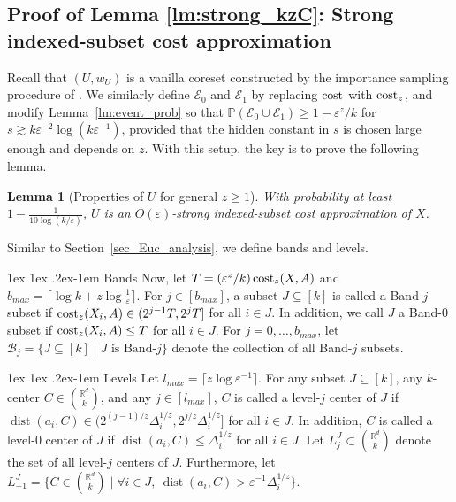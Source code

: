 \documentclass[11pt,letterpaper]{article}
\makeatletter
\renewcommand{\paragraph}{%
  \@startsection{paragraph}{4}%
  {\z@}{1ex \@plus 1ex \@minus .2ex}{-1em}%
  {\normalfont\normalsize\bfseries}%
}
\newtheorem{lemma}[theorem]{Lemma}
\theoremstyle{definition}
\newcommand{\eps}{\varepsilon}
\newcommand{\R}{\mathbb{R}}
\DeclareMathOperator{\dist}{dist}
\makeatother
\begin{document}
\subsection{Proof of Lemma \ref{lm:strong_kzC}: Strong indexed-subset cost approximation}

Recall that $(U, w_U)$ is a vanilla coreset constructed by the importance sampling procedure of \cite{bansal2024sensitivity}.
%
We similarly define $\mathcal{E}_0$ and $\mathcal{E}_1$ by replacing $\cost$ with $\cost_z$, and modify Lemma~\ref{lm:event_prob} so that $\mathbb{P}(\mathcal{E}_0\cup\mathcal{E}_1)\geq 1 - \eps^z/k$ for $s\gtrsim k\eps^{-2}\log(k\eps^{-1})$, provided that the hidden constant in $s$ is chosen large enough and depends on $z$.
%
With this setup, the key is to prove the following lemma.
%

\begin{lemma}[Properties of $U$ for general $z\geq 1$] 
\label{lemma_Euc_U_subset_kzC}
With probability at least $1-\frac{1}{10\log(k/\eps)}$, $U$ is an $O(\eps)$-strong indexed-subset cost approximation of $X$.
\end{lemma}

Similar to Section~\ref{sec_Euc_analysis}, we define bands and levels.

\paragraph{Bands} Now, let $T = (\eps^z/k) \cost_z(X,A)$ and $b_{max}=\lceil \log k + z\log \frac{1}{\eps}\rceil$. For $j\in [b_{max}]$, a subset $J\subseteq [k]$ is called a Band-$j$ subset if $\cost_z(X_i,A)\in (2^{j-1}T,2^jT]$ for all $i\in J$. In addition, we call $J$ a Band-$0$ subset if $\cost_z(X_i,A)\leq T$ for all $i\in J$. For $j=0,\dots,b_{max}$, let $\mathcal{B}_j=\{J\subseteq [k]\mid J\text{ is Band-}j\}$ denote the collection of all Band-$j$ subsets.

\paragraph{Levels} Let $l_{max}=\lceil z\log \eps^{-1}\rceil$. For any subset $J\subseteq[k]$, any $k$-center $C\in \binom{\mathbb{R}^d}{k}$, and any $j\in [l_{max}]$, $C$ is called a level-$j$ center of $J$ if $\dist(a_i,C)\in (2^{(j-1)/z}\Delta_i^{1/z}, 2^{j/z} \Delta_i^{1/z}]$ for all $i\in J$. 
In addition, $C$ is called a level-$0$ center of $J$ if $\dist(a_i,C)\leq \Delta_i^{1/z}$ for all $i\in J$. Let $L^J_j\subset \binom{\mathbb{R}^d}{k}$ denote the set of all level-$j$ centers of $J$. Furthermore, let $L^{J}_{-1}=\{C\in \binom{\R^d}{k}\mid \forall i\in J,\ \dist(a_i,C) > \eps^{-1} \Delta_i^{1/z}\}$.
\end{document}
